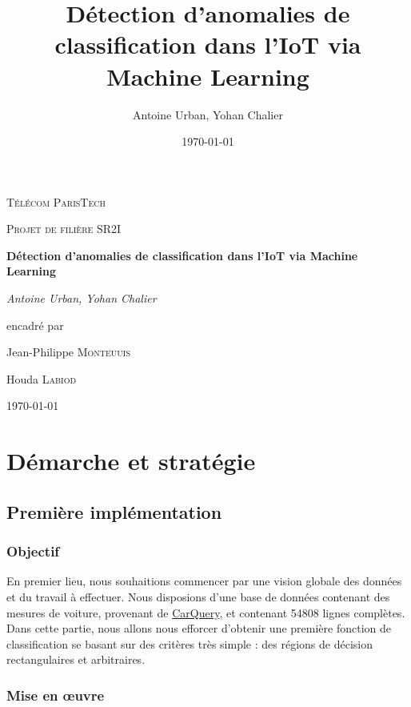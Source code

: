 \documentclass[a4paper]{report}
\title{Détection d'anomalies de classification dans l'IoT via Machine Learning}
\author{Antoine Urban, Yohan Chalier}
\date{\today}
\begin{document}
\begin{titlepage}
	\centering
	\vspace{1cm}
	{\scshape\LARGE Télécom ParisTech \par}
	\vspace{1cm}
	{\scshape\Large Projet de filière SR2I \par}
	\vspace{1.5cm}
	{\huge\bfseries Détection d'anomalies de classification dans l'IoT via Machine Learning\par}
	\vspace{2cm}
	{\Large\itshape Antoine Urban, Yohan Chalier \par}
	\vfill
	encadré par\par
	Jean-Philippe \textsc{Monteuuis}\par
	Houda \textsc{Labiod}
	\vfill

	{\large \today\par}
\end{titlepage}



\begin{abstract}
\end{abstract}

\chapter{Démarche et stratégie}

\section{Première implémentation}

\subsection{Objectif}

En premier lieu, nous souhaitions commencer par une vision globale des données et du travail à effectuer. Nous disposions d'une base de données contenant des mesures de voiture, provenant de \href{http://www.carqueryapi.com}{CarQuery}, et contenant 54808 lignes complètes. Dans cette partie, nous allons nous efforcer d'obtenir une première fonction de classification se basant sur des critères très simple : des régions de décision rectangulaires et arbitraires.

\subsection{Mise en {\oe}uvre}
\end{document}
